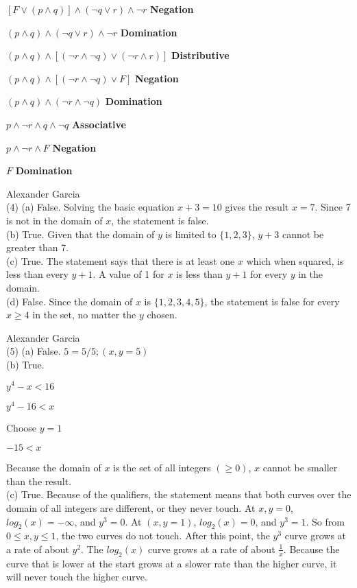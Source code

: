 \documentclass[]{article}
\def\OR{\vee}
\def\AND{\wedge}
\begin{document}
$[F \OR (p \AND q)] \AND (\neg q \OR r) \AND \neg r$ \textbf{Negation}

$(p \AND q) \AND (\neg q \OR r) \AND \neg r$ \textbf{Domination}

$(p \AND q) \AND [(\neg r \AND \neg q) \OR (\neg r \AND r)]$ \textbf{Distributive}

$(p \AND q) \AND [(\neg r \AND \neg q) \OR F]$ \textbf{Negation}

$(p \AND q) \AND (\neg r \AND \neg q)$ \textbf{Domination}

$p \AND \neg r \AND q \AND \neg q$ \textbf{Associative}

$p \AND \neg r \AND F$ \textbf{Negation}

$F$ \textbf{Domination}

\newpage

Alexander Garcia\\

\noindent (4) (a) False. Solving the basic equation $x + 3 = 10$ gives the result $x = 7$. Since 7 is not in the domain of $x$, the statement is false. \\

(b) True. Given that the domain of $y$ is limited to $\{1, 2, 3\}$, $y+ 3$ cannot be greater than 7. \\

(c) True. The statement says that there is at least one $x$ which when squared, is less than every $y + 1$. A value of 1 for $x$ is less than $y + 1$ for every $y$ in the domain. \\

(d) False. Since the domain of $x$ is $\{1, 2, 3, 4, 5\}$, the statement is false for every $x \geq 4$ in the set, no matter the $y$ chosen.

\newpage

Alexander Garcia\\

\noindent (5) (a) False. $5 = 5 / 5; (x, y = 5)$ \\

(b) True.

$y^4 - x < 16$

$y ^ 4 - 16 < x$

Choose $y = 1$

$-15 < x$

Because the domain of $x$ is the set of all integers $(\geq 0)$, $x$ cannot be smaller than the result.\\

(c) True. Because of the qualifiers, the statement means that both curves over the domain of all integers are different, or they never touch. At $x, y = 0$, $log_2(x) = -\infty$, and $y ^ 3 = 0$. At $(x, y = 1)$, $log_2(x) = 0$, and $y^3 = 1$. So from $0 \leq x, y \leq 1$, the two curves do not touch. After this point, the $y ^ 3$ curve grows at a rate of about $y ^ 2$. The $log_2(x)$ curve grows at a rate of about $\frac{1}{x}$. Because the curve that is lower at the start grows at a slower rate than the higher curve, it will never touch the higher curve.
\end{document}
